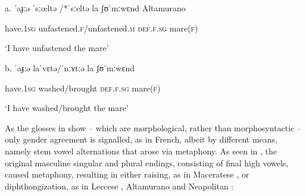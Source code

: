 \documentclass[output=paper]{langscibook}
\begin{document}
\begin{styleTabellaLUNGA}
\ea%
    \label{ex:key:18}
    \gll \\
         \\
    \glt
    \z %

          a.  ˈaɟːə     ˈsːœltə /*ˈsːeltə        la     ʃʊˈmːwɛnd    Altamurano
\end{styleTabellaLUNGA}

\begin{styleTabellaLUNGA}
    have.1\textsc{sg}  unfastened.\textsc{f}/unfastened.\textsc{m}  \textsc{def.f.sg}  mare(\textsc{f)}   
\end{styleTabellaLUNGA}

\begin{styleTabellaLUNGA}
    ‘I have unfastened the mare’              
\end{styleTabellaLUNGA}

\begin{styleTabellaLUNGA}
  b.  ˈaɟːə     laˈvɛtə/ˈnːʏtːə    la     ʃʊˈmːwɛnd      
\end{styleTabellaLUNGA}

\begin{styleTabellaLUNGA}
    have.1\textsc{sg}  washed/brought    \textsc{def.f.sg}   mare(\textsc{f)}
\end{styleTabellaLUNGA}

\begin{styleTabellaLUNGA}
    ‘I have washed/brought the mare’
\end{styleTabellaLUNGA}

As the glosses in  show – which are morphological, rather than morphosyntactic – only gender agreement is signalled, as in French, albeit by different means, namely stem vowel alternations that arose via metaphony. As seen in , the original masculine singular and plural endings, consisting of final high vowels, caused metaphony, resulting in either raising, as in Maceratese , or diphthongization, as in Leccese , Altamurano and Neapolitan :
\end{document}
